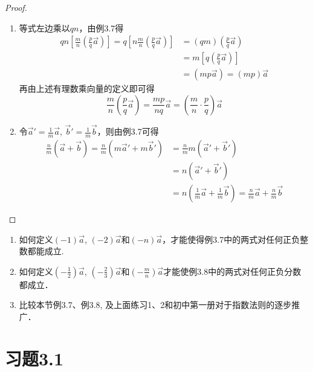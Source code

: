 \begin{proof}
\begin{enumerate}
    \item 等式左边乘以$qn$，由例3.7得
\[\begin{split}
qn\left[\frac{m}{n}\left(\frac{p}{q}\vec{a}\right)\right]=q\left[n\frac{m}{n}\left(\frac{p}{q}\vec{a}\right)\right]&=(qm)\left(\frac{p}{q}\vec{a}\right)\\
&=m\left[q\left(\frac{p}{q}\vec{a}\right)\right]\\
&=\left(mp\vec{a}\right)=(mp)\vec{a}
\end{split}\]
再由上述有理数乘向量的定义即可得
\[\frac{m}{n}\left(\frac{p}{q}\vec{a}\right)=\frac{mp}{nq}\vec{a}=\left(\frac{m}{n}\cdot \frac{p}{q}\right)\vec{a}\]

\item 令$\vec{a}'=\frac{1}{m}\vec{a}$, $\vec{b}'=\frac{1}{m}\vec{b}$，则由例3.7可得
\[\begin{split}
    \frac{n}{m}\left(\vec{a}+\vec{b}\right)=\frac{n}{m}\left(m\vec{a}'+m\vec{b}'\right)&=\frac{n}{m}m\left(\vec{a}'+\vec{b}'\right)\\
&=n\left(\vec{a}'+\vec{b}'\right)\\
&=n\left(\frac{1}{m}\vec{a}+\frac{1}{m}\vec{b}\right)
=\frac{n}{m}\vec{a}+\frac{n}{m}\vec{b}
\end{split}\]
\end{enumerate}
\end{proof}

\begin{ex}
\begin{enumerate}
    \item 如何定义$(-1)\vec{a}$, $(-2)\vec{a}$和$(-n)\vec{a}$，才能使得例3.7中的两式对任何正负整数都能成立.
    \item 如何定义$\left(-\frac{1}{2}\right)\vec{a}$, $\left(-\frac{2}{3}\right)\vec{a}$和$\left(-\frac{m}{n}\right)\vec{a}$才能使例3.8中的两式对任何正负分数都成立．
    \item 比较本节例3.7、例3.8, 及上面练习1、2和初中第一册对于指数法则的逐步推广．
\end{enumerate}   
\end{ex}

\section*{习题3.1}

